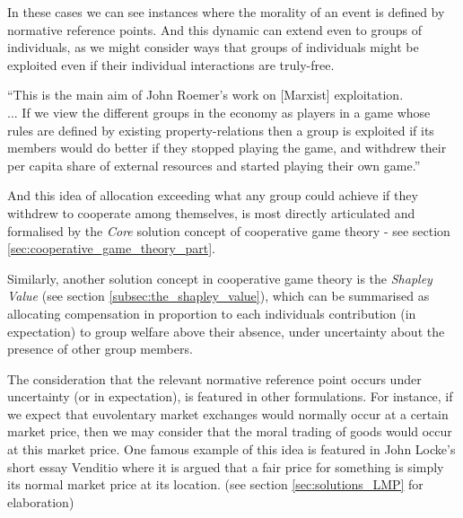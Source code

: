 In these cases we can see instances where the morality of an event is defined by normative reference points. And this dynamic can extend even to groups of individuals, as we might consider ways that groups of individuals might be exploited even if their individual interactions are truly-free.
\begin{displayquote}
``This is the main aim of John Roemer's work on [Marxist] exploitation.\\... %
If we view the different groups in the economy as players in a game whose rules are defined by existing property-relations then a group is exploited if its members would do better if they stopped playing the game, and withdrew their per capita share of external resources and started playing their own game.''\cite{kymlicka2002contemporary}
\end{displayquote}
And this idea of allocation exceeding what any group could achieve if they withdrew to cooperate among themselves, is most directly articulated and formalised by the \textit{Core} solution concept of cooperative game theory - see section \ref{sec:cooperative_game_theory_part}.

Similarly, another solution concept in cooperative game theory is the \textit{Shapley Value} (see section \ref{subsec:the_shapley_value}), which can be summarised as allocating compensation in proportion to each individuals contribution (in expectation) to group welfare above their absence, under uncertainty about the presence of other group members.

The consideration that the relevant normative reference point occurs under uncertainty (or in expectation), is featured in other formulations.
For instance, if we expect that euvolentary market exchanges would normally occur at a certain market price, then we may consider that the moral trading of goods would occur at this market price.
One famous example of this idea is featured in John Locke's short essay Venditio \cite{locke2003locke} where it is argued that a fair price for something is simply its normal market price at its location. (see section \ref{sec:solutions_LMP} for elaboration)


